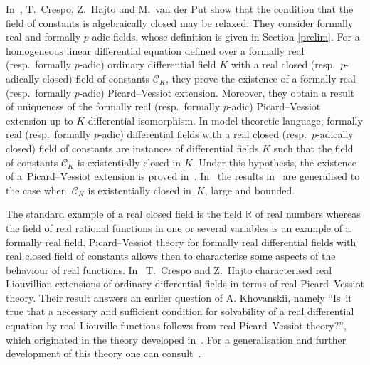 \documentclass[pdftex]{sigma}%
\numberwithin{equation}{section}
\newcommand{\R}{\mathbb{R}}
\begin{document}
In~\cite{CHP}, T.~Crespo, Z.~Hajto and M.~van der Put show that the condition that the field of constants is algebraically closed may be relaxed. They consider formally real and formally $p$-adic fields, whose definition is given in Section \ref{prelim}.
For a homogeneous linear differential equation defined over a formally real (resp.\ formally $p$-adic) ordinary differential field $K$ with a real closed (resp.\ $p$-adically closed) field of constants $\mathcal{C}_K$, they prove the existence of a formally real (resp.\ formally $p$-adic) Picard--Vessiot extension. Moreover, they obtain a result of uniqueness of the formally real (resp.\ formally $p$-adic) Picard--Vessiot extension up to $K$-differential isomorphism. In model theoretic language, formally real (resp.\ formally $p$-adic) differential fields with a real closed (resp.\ $p$-adically closed) field of constants are instances of differential fields $K$ such that the field of constants $\mathcal{C}_K$ is existentially closed in $K$. Under this hypothesis, the existence of a~Picard--Vessiot extension is proved in~\cite[Theorem~2.2]{GGO}. In~\cite{KP} the results in~\cite{CHP} are generalised to the case when~$\mathcal{C}_K$ is existentially closed in~$K$, large and bounded.

The standard example of a real closed field is the field $\R$ of real numbers whereas the field of real rational functions in one or several variables is an example of a formally real field. Picard--Vessiot theory for formally real differential fields with real closed field of constants allows then to characterise some aspects of the behaviour of real functions. In~\cite{CH} T.~Crespo and Z.~Hajto characterised real Liouvillian extensions of ordinary differential fields in terms of real Picard--Vessiot theory. Their result answers an earlier question of A. Khovanskii, namely ``Is~it true that a necessary and sufficient condition for solvability of a real differential equation by real Liouville functions follows from real Picard--Vessiot theory?'', which originated in the theory developed in~\cite{GK}. For a generalisation and further development of this theory one can consult~\cite{Kh}.
\end{document}
